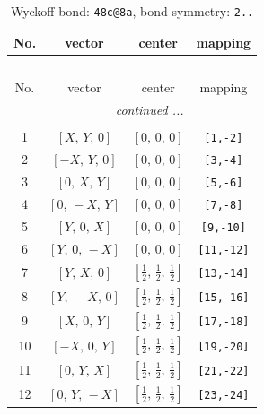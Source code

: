 \documentclass[fleqn,8pt]{jsarticle}
\begin{document}
\begin{longtable}{cccc}
\caption{Wyckoff bond: {\tt 48c@8a}, bond symmetry: {\tt 2..}}
 \\
 \hline \hline
No. & vector & center & mapping \\ \hline \endfirsthead

\multicolumn{3}{l}{\tablename\ \thetable{}} \\
 \hline \hline
No. & vector & center & mapping \\ \hline \endhead

 \hline \hline
\multicolumn{3}{r}{\footnotesize\it continued ...} \\ \endfoot

 \hline \hline
\multicolumn{3}{r}{} \\ \endlastfoot

1 & $\left[ X,\, Y,\, 0 \right]$ & $\left[ 0,\, 0,\, 0 \right]$ & {\tt [1,-2]} \\ \hline
2 & $\left[ - X,\, Y,\, 0 \right]$ & $\left[ 0,\, 0,\, 0 \right]$ & {\tt [3,-4]} \\ \hline
3 & $\left[ 0,\, X,\, Y \right]$ & $\left[ 0,\, 0,\, 0 \right]$ & {\tt [5,-6]} \\ \hline
4 & $\left[ 0,\, - X,\, Y \right]$ & $\left[ 0,\, 0,\, 0 \right]$ & {\tt [7,-8]} \\ \hline
5 & $\left[ Y,\, 0,\, X \right]$ & $\left[ 0,\, 0,\, 0 \right]$ & {\tt [9,-10]} \\ \hline
6 & $\left[ Y,\, 0,\, - X \right]$ & $\left[ 0,\, 0,\, 0 \right]$ & {\tt [11,-12]} \\ \hline
7 & $\left[ Y,\, X,\, 0 \right]$ & $\left[ \frac{1}{2},\, \frac{1}{2},\, \frac{1}{2} \right]$ & {\tt [13,-14]} \\ \hline
8 & $\left[ Y,\, - X,\, 0 \right]$ & $\left[ \frac{1}{2},\, \frac{1}{2},\, \frac{1}{2} \right]$ & {\tt [15,-16]} \\ \hline
9 & $\left[ X,\, 0,\, Y \right]$ & $\left[ \frac{1}{2},\, \frac{1}{2},\, \frac{1}{2} \right]$ & {\tt [17,-18]} \\ \hline
10 & $\left[ - X,\, 0,\, Y \right]$ & $\left[ \frac{1}{2},\, \frac{1}{2},\, \frac{1}{2} \right]$ & {\tt [19,-20]} \\ \hline
11 & $\left[ 0,\, Y,\, X \right]$ & $\left[ \frac{1}{2},\, \frac{1}{2},\, \frac{1}{2} \right]$ & {\tt [21,-22]} \\ \hline
12 & $\left[ 0,\, Y,\, - X \right]$ & $\left[ \frac{1}{2},\, \frac{1}{2},\, \frac{1}{2} \right]$ & {\tt [23,-24]} \\
\end{longtable}
\end{document}
